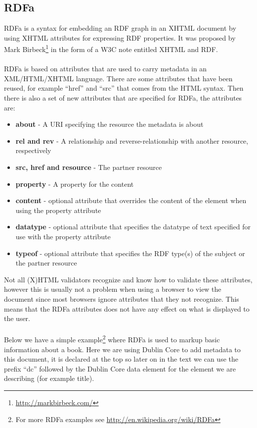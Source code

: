 \subsection{RDFa}
RDFa is a syntax for embedding an RDF graph in an XHTML document by using XHTML attributes for expressing RDF properties. It was proposed by Mark Birbeck\footnote{\url{http://markbirbeck.com/}} in the form of a W3C note entitled XHTML and RDF\cite{rdfaBib}.\\\\
RDFa is based on attributes that are used to carry metadata in an XML/HTML/XHTML language. There are some attributes that have been reused, for example “href” and “src” that comes from the HTML syntax. Then there is also a set of new attributes that are specified for RDFa, the attributes are:\cite{rdfaBib2}
\begin{itemize}
\item \textbf{about} - A URI specifying the resource the metadata is about
\item \textbf{rel and rev} - A relationship and reverse-relationship with another resource, respectively
\item \textbf{src, href and resource} - The partner resource
\item \textbf{property} - A property for the content
\item \textbf{content} - optional attribute that overrides the content of the element when using the property attribute
\item \textbf{datatype} - optional attribute that specifies the datatype of text specified for use with the property attribute
\item \textbf{typeof} - optional attribute that specifies the RDF type(s) of the subject or the partner resource
\end{itemize}
Not all (X)HTML validators recognize and know how to validate these attributes, however this is usually not a problem when using a browser to view the document since most browsers ignore attributes that they not recognize. This means that the RDFa attributes does not have any effect on what is displayed to the user.\\\\
Below we have a simple example\footnote{For more RDFa examples see \url{http://en.wikipedia.org/wiki/RDFa}} where RDFa is used to markup basic information about a book. Here we are using Dublin Core to add metadata to this document, it is declared at the top so later on in the text we can use the prefix “dc” followed by the Dublin Core data element for the element we are describing (for example title).\\  
